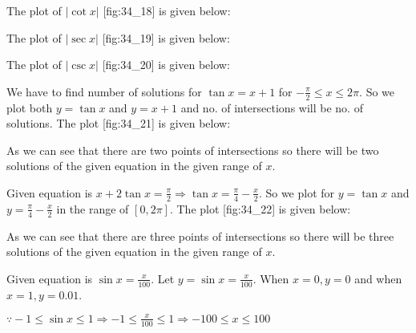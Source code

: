   \startplacefigure[title={Plot of $|\tan x|$}, reference=fig:34_17]
    \externalfigure[34_17.pdf]
  \stopplacefigure
\item The plot of $|\cot x|$ [fig:34_18] is given below:

  \startplacefigure[title={Plot of $|\cot x|$}, reference=fig:34_18]
    \externalfigure[34_18.pdf]
  \stopplacefigure
\item The plot of $|\sec x|$ [fig:34_19] is given below:

  \startplacefigure[title={Plot of $|\sec x|$}, reference=fig:34_19]
    \externalfigure[34_19.pdf]
  \stopplacefigure
\item The plot of $|\csc x|$ [fig:34_20] is given below:

  \startplacefigure[title={Plot of $|\csc x|$}, reference=fig:34_20]
    \externalfigure[34_20.pdf]
  \stopplacefigure
\item We have to find number of solutions for $\tan x = x + 1$ for $-\frac{\pi}{2}\leq x\leq
  2\pi$. So we plot both $y = \tan x$ and $y = x + 1$ and no. of  intersections will be no. of
  solutions. The plot [fig:34_21] is given below:

  \startplacefigure[title={Plot of $\tan x$ and $x + 1$}, reference=fig:34_21]
    \externalfigure[34_21.pdf]
  \stopplacefigure

  As we can see that there are two points of intersections so there will be two solutions of the given
  equation in the given range of $x$.

\item Given equation is $x + 2\tan x = \frac{\pi}{2} \Rightarrow \tan x = \frac{\pi}{4} -
  \frac{x}{2}$. So we plot for $y = \tan x$ and $y = \frac{\pi}{4} - \frac{x}{2}$ in the range
  of $[0, 2\pi]$. The plot [fig:34_22] is given below:

  \startplacefigure[title={Plot of $\tan x$ and $\frac{\pi}{4} - \frac{x}{2}$}, reference=fig:34_22]
    \externalfigure[34_22.pdf]
  \stopplacefigure

    As we can see that there are three points of intersections so there will be three solutions of the given
    equation in the given range of $x$.

\item Given equation is $\sin x = \frac{x}{100}$. Let $y = \sin x = \frac{x}{100}$. When $x
  = 0, y = 0$ and when $x = 1, y = 0.01$.

  $\because -1\leq \sin x\leq 1 \Rightarrow -1\leq \frac{x}{100}\leq 1 \Rightarrow -100\leq x\leq
  100$

